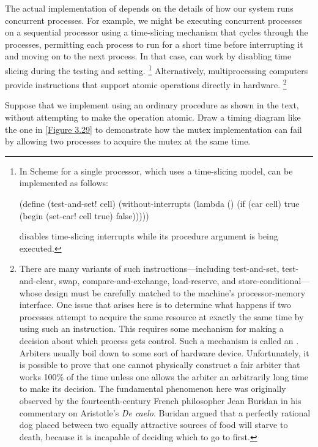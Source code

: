 The actual implementation of  depends on the details of how our system runs concurrent processes.
For example, we might be executing concurrent processes on a sequential processor using a time-slicing mechanism that cycles through the processes, permitting each process to run for a short time before interrupting it and moving on to the next process.
In that case,  can work by disabling time slicing during the testing and setting.%
\footnote{
	In  Scheme for a single processor, which uses a
	time-slicing model,  can be implemented as follows:
	\begin{smallscheme}
	  (define (test-and-set! cell)
	    (without-interrupts
	     (lambda ()
	       (if (car cell)
	           true
	           (begin (set-car! cell true)
	                  false)))))
	\end{smallscheme}
	 disables time-slicing interrupts while its procedure
	argument is being executed.
}
Alternatively, multiprocessing computers provide instructions that support atomic operations directly in hardware.%
\footnote{
	There are many variants of such instructions---including test-and-set, test-and-clear, swap, compare-and-exchange, load-reserve, and store-conditional---whose design must be carefully matched to the machine’s processor-memory interface.
	One issue that arises here is to determine what happens if two processes attempt to acquire the same resource at exactly the same time by using such an instruction.
	This requires some mechanism for making a decision about which process gets control.
	Such a mechanism is called an .
	Arbiters usually boil down to some sort of hardware device.
	Unfortunately, it is possible to prove that one cannot physically construct a fair arbiter that works 100\% of the time unless one allows the arbiter an arbitrarily long time to make its decision.
	The fundamental phenomenon here was originally observed by the fourteenth-century French philosopher Jean Buridan in his commentary on Aristotle’s \textit{De caelo}.
	Buridan argued that a perfectly rational dog placed between two equally attractive sources of food will starve to death, because it is incapable of deciding which to go to first.
}



\begin{exercise}
	\label{Exercise 3.46}
	Suppose that we implement  using an ordinary procedure as shown in the text, without attempting to make the operation atomic.
	Draw a timing diagram like the one in \cref{Figure 3.29} to demonstrate how the mutex implementation can fail by allowing two processes to acquire the mutex at the same time.
\end{exercise}



